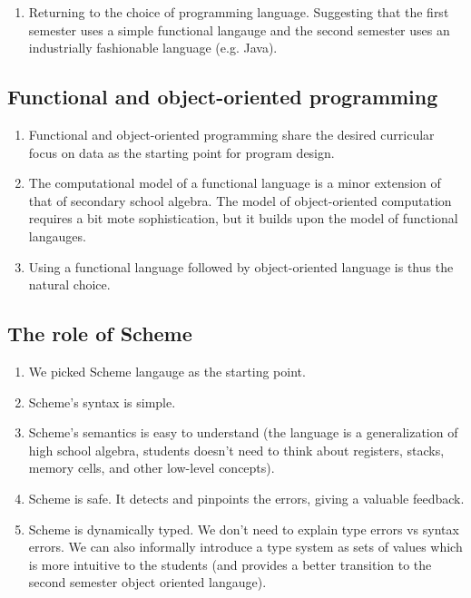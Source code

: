 \documentclass{article}
\begin{document}
\begin{enumerate}
\item Returning to the choice of programming language. Suggesting that
  the first semester uses a simple functional langauge and the second
  semester uses an industrially fashionable language (e.g. Java).
\end{enumerate}

\subsection{Functional and object-oriented programming}

\begin{enumerate}
\item Functional and object-oriented programming share the desired
  curricular focus on data as the starting point for program design.
\item The computational model of a functional language is a minor
  extension of that of secondary school algebra. The model of
  object-oriented computation requires a bit mote sophistication, but
  it builds upon the model of functional langauges.
\item Using a functional language followed by object-oriented language
  is thus the natural choice.
\end{enumerate}

\subsection{The role of Scheme}

\begin{enumerate}
\item We picked Scheme langauge as the starting point.
\item Scheme's syntax is simple.
\item Scheme's semantics is easy to understand (the language is a
  generalization of high school algebra, students doesn't need to
  think about registers, stacks, memory cells, and other low-level
  concepts).
\item Scheme is safe. It detects and pinpoints the errors, giving a
  valuable feedback.
\item Scheme is dynamically typed. We don't need to explain type
  errors vs syntax errors. We can also informally introduce a type
  system as sets of values which is more intuitive to the students
  (and provides a better transition to the second semester object
  oriented langauge).
\end{enumerate}
\end{document}
